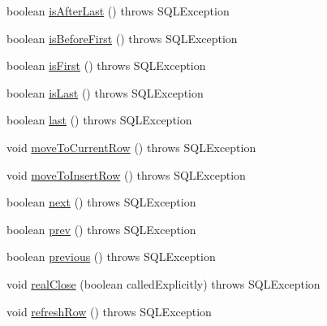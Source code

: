 \begin{DoxyCompactItemize}
boolean \mbox{\hyperlink{classcom_1_1mysql_1_1cj_1_1jdbc_1_1result_1_1_updatable_result_set_a93093c9ae1297494d21d69ab26142156}{is\+After\+Last}} ()  throws S\+Q\+L\+Exception 
\item 
boolean \mbox{\hyperlink{classcom_1_1mysql_1_1cj_1_1jdbc_1_1result_1_1_updatable_result_set_a174c21b3b9c137b7826b4b10fb70e794}{is\+Before\+First}} ()  throws S\+Q\+L\+Exception 
\item 
boolean \mbox{\hyperlink{classcom_1_1mysql_1_1cj_1_1jdbc_1_1result_1_1_updatable_result_set_a40d61392ead77e4c3f63a2667bbaccdd}{is\+First}} ()  throws S\+Q\+L\+Exception 
\item 
boolean \mbox{\hyperlink{classcom_1_1mysql_1_1cj_1_1jdbc_1_1result_1_1_updatable_result_set_a7be5e37f0a5ebbf08775a5a51dffdc3a}{is\+Last}} ()  throws S\+Q\+L\+Exception 
\item 
boolean \mbox{\hyperlink{classcom_1_1mysql_1_1cj_1_1jdbc_1_1result_1_1_updatable_result_set_acdd061bc28fadb09ad9e3dd1868ee765}{last}} ()  throws S\+Q\+L\+Exception 
\item 
void \mbox{\hyperlink{classcom_1_1mysql_1_1cj_1_1jdbc_1_1result_1_1_updatable_result_set_a73202aa266fab1e099a655accb1f6c4d}{move\+To\+Current\+Row}} ()  throws S\+Q\+L\+Exception 
\item 
void \mbox{\hyperlink{classcom_1_1mysql_1_1cj_1_1jdbc_1_1result_1_1_updatable_result_set_a634d7d658dfdbfe109e464aa79d1ce42}{move\+To\+Insert\+Row}} ()  throws S\+Q\+L\+Exception 
\item 
boolean \mbox{\hyperlink{classcom_1_1mysql_1_1cj_1_1jdbc_1_1result_1_1_updatable_result_set_ad259f36083fd66869e9634e155df47c1}{next}} ()  throws S\+Q\+L\+Exception 
\item 
boolean \mbox{\hyperlink{classcom_1_1mysql_1_1cj_1_1jdbc_1_1result_1_1_updatable_result_set_af7df750711fc6eb99192cd40adfd75e9}{prev}} ()  throws S\+Q\+L\+Exception 
\item 
boolean \mbox{\hyperlink{classcom_1_1mysql_1_1cj_1_1jdbc_1_1result_1_1_updatable_result_set_a1e8d88fb59529a80f79dd6a4c71920f5}{previous}} ()  throws S\+Q\+L\+Exception 
\item 
void \mbox{\hyperlink{classcom_1_1mysql_1_1cj_1_1jdbc_1_1result_1_1_updatable_result_set_aa7c422ba94c2a8a8727c57160bd946bd}{real\+Close}} (boolean called\+Explicitly)  throws S\+Q\+L\+Exception 
\item 
void \mbox{\hyperlink{classcom_1_1mysql_1_1cj_1_1jdbc_1_1result_1_1_updatable_result_set_abbdb6496de2649e552a76ebbd991c51a}{refresh\+Row}} ()  throws S\+Q\+L\+Exception 
\item 

\end{DoxyCompactItemize}
